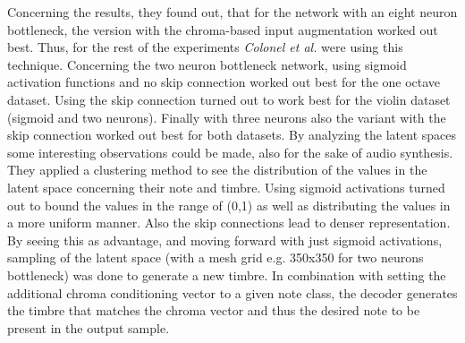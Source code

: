 Concerning the results, they found out, that for the network with an eight neuron bottleneck, the version with the chroma-based input augmentation worked out best. Thus, for the rest of the experiments \textit{Colonel et al.} were using this technique. Concerning the two neuron bottleneck network, using sigmoid activation functions and no skip connection worked out best for the one octave dataset. Using the skip connection turned out to work best for the violin dataset (sigmoid and two neurons). Finally with three neurons also the variant with the skip connection worked out best for both datasets. By analyzing the latent spaces some interesting observations could be made, also for the sake of audio synthesis. They applied a clustering method to see the distribution of the values in the latent space concerning their note and timbre. Using sigmoid activations turned out to bound the values in the range of (0,1) as well as distributing the values in a more uniform manner. Also the skip connections lead to denser representation. By seeing this as advantage, and moving forward with just sigmoid activations, sampling of the latent space (with a mesh grid e.g. 350x350 for two neurons bottleneck) was done to generate a new timbre. In combination with setting the additional chroma conditioning vector to a given note class, the decoder generates the timbre that matches the chroma vector and thus the desired note to be present in the output sample.\\

